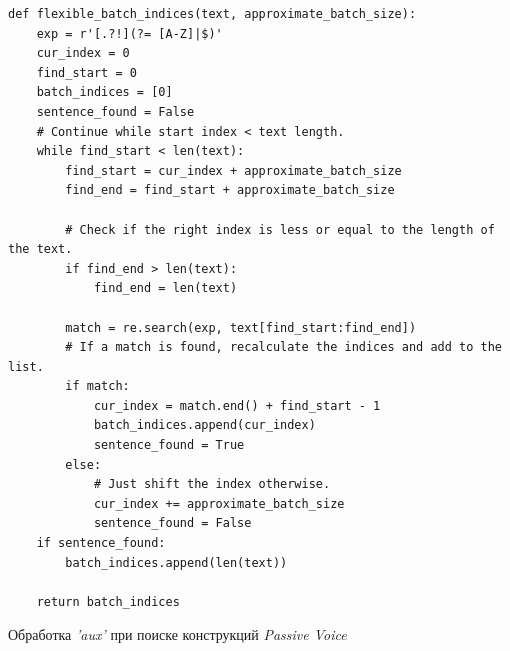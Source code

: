 \begin{ListingEnv}[h]
\begin{lstlisting}
def flexible_batch_indices(text, approximate_batch_size):
    exp = r'[.?!](?= [A-Z]|$)'
    cur_index = 0
    find_start = 0
    batch_indices = [0]
    sentence_found = False
    # Continue while start index < text length.
    while find_start < len(text):
        find_start = cur_index + approximate_batch_size
        find_end = find_start + approximate_batch_size

        # Check if the right index is less or equal to the length of the text.
        if find_end > len(text):
            find_end = len(text)
     
        match = re.search(exp, text[find_start:find_end])
        # If a match is found, recalculate the indices and add to the list.
        if match:
            cur_index = match.end() + find_start - 1
            batch_indices.append(cur_index)
            sentence_found = True
        else:
            # Just shift the index otherwise.
            cur_index += approximate_batch_size
            sentence_found = False
    if sentence_found:
        batch_indices.append(len(text))
        
    return batch_indices
\end{lstlisting}
\caption{Обработка \emph{'aux'} при поиске конструкций \emph{Passive Voice}}
\label{list:aux}
\end{ListingEnv}




%
%
%
%

